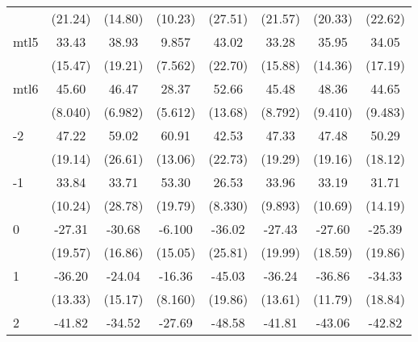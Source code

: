 \documentclass{article}
\begin{document}
{\begin{longtable}{l*{7}{c}}
                &  (21.24)         &  (14.80)         &  (10.23)         &  (27.51)         &  (21.57)         &  (20.33)         &  (22.62)         \\
mtl5            &    33.43         &    38.93         &    9.857         &    43.02         &    33.28         &    35.95\sym{*}  &    34.05         \\
                &  (15.47)         &  (19.21)         &  (7.562)         &  (22.70)         &  (15.88)         &  (14.36)         &  (17.19)         \\
mtl6            &    45.60\sym{***}&    46.47\sym{***}&    28.37\sym{***}&    52.66\sym{**} &    45.48\sym{***}&    48.36\sym{***}&    44.65\sym{**} \\
                &  (8.040)         &  (6.982)         &  (5.612)         &  (13.68)         &  (8.792)         &  (9.410)         &  (9.483)         \\
-2              &    47.22\sym{*}  &    59.02         &    60.91\sym{**} &    42.53         &    47.33\sym{*}  &    47.48\sym{*}  &    50.29\sym{*}  \\
                &  (19.14)         &  (26.61)         &  (13.06)         &  (22.73)         &  (19.29)         &  (19.16)         &  (18.12)         \\
-1              &    33.84\sym{**} &    33.71         &    53.30\sym{*}  &    26.53\sym{*}  &    33.96\sym{**} &    33.19\sym{*}  &    31.71         \\
                &  (10.24)         &  (28.78)         &  (19.79)         &  (8.330)         &  (9.893)         &  (10.69)         &  (14.19)         \\
0               &   -27.31         &   -30.68         &   -6.100         &   -36.02         &   -27.43         &   -27.60         &   -25.39         \\
                &  (19.57)         &  (16.86)         &  (15.05)         &  (25.81)         &  (19.99)         &  (18.59)         &  (19.86)         \\
1               &   -36.20\sym{*}  &   -24.04         &   -16.36         &   -45.03\sym{*}  &   -36.24\sym{*}  &   -36.86\sym{*}  &   -34.33         \\
                &  (13.33)         &  (15.17)         &  (8.160)         &  (19.86)         &  (13.61)         &  (11.79)         &  (18.84)         \\
2               &   -41.82\sym{**} &   -34.52\sym{*}  &   -27.69\sym{*}  &   -48.58\sym{**} &   -41.81\sym{**} &   -43.06\sym{**} &   -42.82\sym{***}\\

\end{longtable}}
\end{document}
